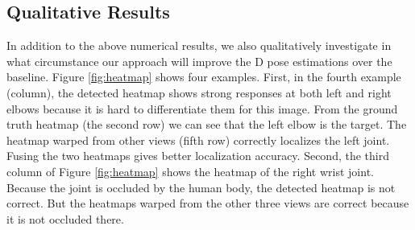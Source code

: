 \documentclass[10pt,twocolumn,letterpaper]{article}
\begin{document}
\subsection{Qualitative Results}
In addition to the above numerical results, we also qualitatively investigate in what circumstance our approach will improve the D pose estimations over the baseline. Figure \ref{fig:heatmap} shows four examples. First, in the fourth example (column), the detected heatmap shows strong responses at both left and right elbows because it is hard to differentiate them for this image. From the ground truth heatmap (the second row) we can see that the left elbow is the target. The heatmap warped from other views (fifth row) correctly localizes the left joint. Fusing the two heatmaps gives better localization accuracy. Second, the third column of Figure \ref{fig:heatmap} shows the heatmap of the right wrist joint. Because the joint is occluded by the human body, the detected heatmap is not correct. But the heatmaps warped from the other three views are correct because it is not occluded there.
\end{document}
